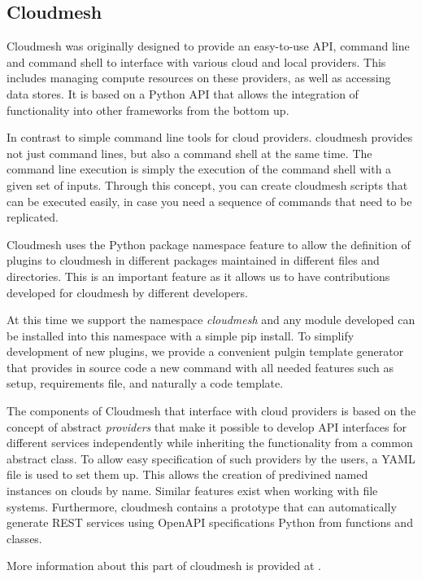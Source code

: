 \documentclass[utf8]{FrontiersinVancouver} %
\begin{document}
\subsection{Cloudmesh}


Cloudmesh was originally designed to provide an easy-to-use API, command line and command shell to interface with various cloud and local providers. This includes managing compute resources on these providers, as well as accessing data stores. It is based on a Python API that allows the integration of functionality into other frameworks from the bottom up. 

In contrast to simple command line tools for cloud providers. cloudmesh provides not just command lines, but also a command shell at the same time. The command line execution is simply the execution of the command shell with a given set of inputs. Through this concept, you can create cloudmesh scripts that can be executed easily, in case you need a sequence of commands that need to be replicated.

Cloudmesh uses the Python package namespace feature to allow the definition of plugins to cloudmesh in different packages maintained in different files and directories. This is an important feature as it allows us to have contributions developed for cloudmesh by different developers.

At this time we support the namespace {\em cloudmesh} and any module developed  can be installed into this namespace with a simple pip install. To simplify development of new plugins, we provide a convenient pulgin template generator that provides in source code a new command with all needed features such as setup, requirements file, and naturally a code template. 

The components of Cloudmesh that interface with cloud providers is based on the concept of abstract {\em providers} that make it possible to develop API interfaces for different services independently while inheriting the functionality from a common abstract class. To allow easy specification of such providers by the users, a YAML file is used to set them up. This allows the creation of predivined named instances on clouds by name. Similar features exist when working with file systems.
Furthermore, cloudmesh contains a prototype that can automatically generate REST services using OpenAPI specifications Python from functions and classes. 

More information about this part of cloudmesh is provided at \citep{www-cloudmesh-org}.
\end{document}
